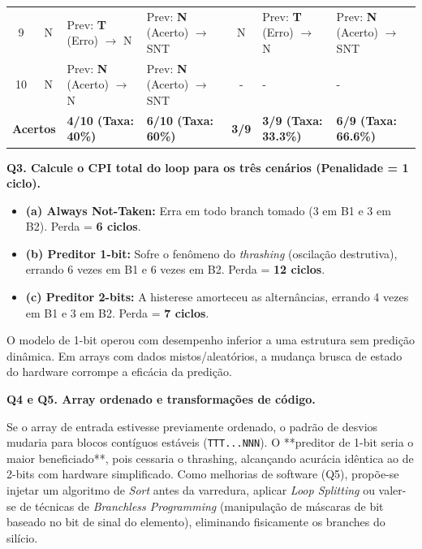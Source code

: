 \documentclass[12pt,a4paper]{article}
\begin{document}
\begin{table}[H]
{\begin{tabular}{@{}ccll|cll@{}}
9  & N & Prev: \textbf{T} (Erro) $\rightarrow$ N & Prev: \textbf{N} (Acerto) $\rightarrow$ SNT & N & Prev: \textbf{T} (Erro) $\rightarrow$ N & Prev: \textbf{N} (Acerto) $\rightarrow$ SNT \\
10 & N & Prev: \textbf{N} (Acerto) $\rightarrow$ N & Prev: \textbf{N} (Acerto) $\rightarrow$ SNT & - & - & - \\ \midrule
\multicolumn{2}{l}{\textbf{Acertos}} & \textbf{4/10 (Taxa: 40\%)} & \textbf{6/10 (Taxa: 60\%)} & \textbf{3/9} & \textbf{3/9 (Taxa: 33.3\%)} & \textbf{6/9 (Taxa: 66.6\%)} \\ \bottomrule
\end{tabular}
}
\end{table}

\textbf{Q3. Calcule o CPI total do loop para os três cenários (Penalidade = 1 ciclo).}
\begin{itemize}
    \item \textbf{(a) Always Not-Taken:} Erra em todo branch tomado (3 em B1 e 3 em B2). Perda = \textbf{6 ciclos}.
    \item \textbf{(b) Preditor 1-bit:} Sofre o fenômeno do \textit{thrashing} (oscilação destrutiva), errando 6 vezes em B1 e 6 vezes em B2. Perda = \textbf{12 ciclos}.
    \item \textbf{(c) Preditor 2-bits:} A histerese amorteceu as alternâncias, errando 4 vezes em B1 e 3 em B2. Perda = \textbf{7 ciclos}.
\end{itemize}
O modelo de 1-bit operou com desempenho inferior a uma estrutura sem predição dinâmica. Em arrays com dados mistos/aleatórios, a mudança brusca de estado do hardware corrompe a eficácia da predição.

\textbf{Q4 e Q5. Array ordenado e transformações de código.}

Se o array de entrada estivesse previamente ordenado, o padrão de desvios mudaria para blocos contíguos estáveis (\texttt{TTT...NNN}). O **preditor de 1-bit seria o maior beneficiado**, pois cessaria o thrashing, alcançando acurácia idêntica ao de 2-bits com hardware simplificado. Como melhorias de software (Q5), propõe-se injetar um algoritmo de \textit{Sort} antes da varredura, aplicar \textit{Loop Splitting} ou valer-se de técnicas de \textit{Branchless Programming} (manipulação de máscaras de bit baseado no bit de sinal do elemento), eliminando fisicamente os branches do silício.

\newpage

\end{document}
